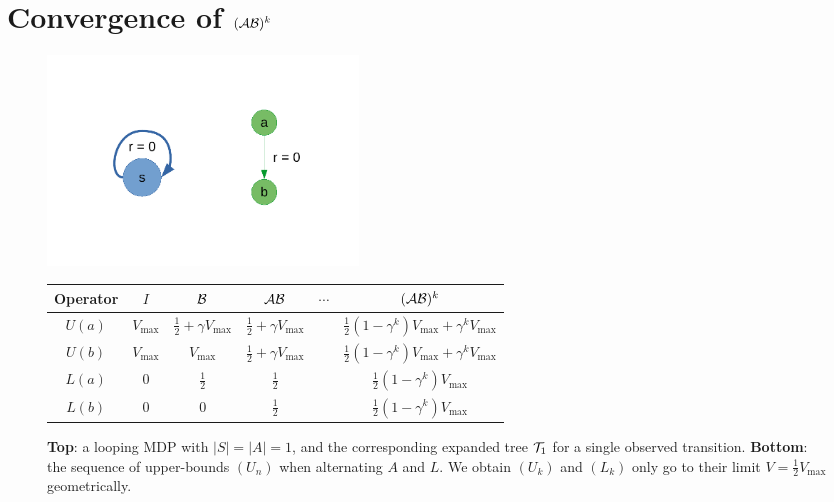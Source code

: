 \documentclass[runningheads]{llncs}
\begin{document}
\section{Convergence of $(\mathcal{A}\mathcal{B})^k$}
\label{sec:convergence}
\begin{figure}[H]
    \centering
    \includegraphics[trim=2cm 2cm 2cm 2cm, clip, width=0.4\textwidth]{img/simple_loop.pdf}\\
    \begin{tabular}{cccccc}
         \toprule
         Operator & $I$ & $\mathcal{B}$ & $\mathcal{A}\mathcal{B}$ & $\cdots$ & $(\mathcal{A}\mathcal{B})^k$ \\
         \midrule
         $U(a)$ & $V_{\max}$ & $\frac{1}{2} + \gamma V_{\max}$ & $\frac{1}{2} + \gamma V_{\max}$ && $\frac{1}{2}(1-\gamma^k)V_{\max} + \gamma^k V_{\max}$\\
         $U(b)$ & $V_{\max}$ & $V_{\max}$ & $\frac{1}{2} + \gamma V_{\max}$ && $\frac{1}{2}(1-\gamma^k)V_{\max} + \gamma^k V_{\max}$\\
         $L(a)$ & $0$ & $\frac{1}{2}$ & $\frac{1}{2}$ && $\frac{1}{2}(1-\gamma^k)V_{\max}$\\
		 $L(b)$ & $0$ & $0$ & $\frac{1}{2}$ && $\frac{1}{2}(1-\gamma^k)V_{\max}$\\
         \bottomrule
    \end{tabular}
    \caption{\textbf{Top}: a looping MDP with $|S|=|A|=1$, and the corresponding expanded tree $\mathcal{T}_1$ for a single observed transition. \textbf{Bottom}: the sequence of upper-bounds $(U_n)$ when alternating $A$ and $L$. We obtain $(U_k)$ and $(L_k)$ only go to their limit $V = \frac{1}{2}V_{\max}$ geometrically.} %
    \label{fig:simple_loop}
\end{figure}


\end{document}
